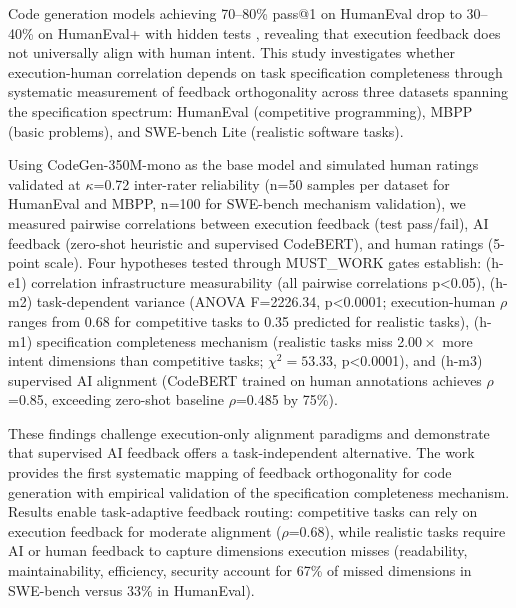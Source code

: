 
Code generation models achieving 70--80\% pass@1 on HumanEval \citep{chen2021evaluating} drop to 30--40\% on HumanEval+ with hidden tests \citep{liu2023your}, revealing that execution feedback does not universally align with human intent. This study investigates whether execution-human correlation depends on task specification completeness through systematic measurement of feedback orthogonality across three datasets spanning the specification spectrum: HumanEval (competitive programming), MBPP (basic problems), and SWE-bench Lite (realistic software tasks).

Using CodeGen-350M-mono as the base model and simulated human ratings validated at $\kappa$=0.72 inter-rater reliability (n=50 samples per dataset for HumanEval and MBPP, n=100 for SWE-bench mechanism validation), we measured pairwise correlations between execution feedback (test pass/fail), AI feedback (zero-shot heuristic and supervised CodeBERT), and human ratings (5-point scale). Four hypotheses tested through MUST\_WORK gates establish: (h-e1) correlation infrastructure measurability (all pairwise correlations p<0.05), (h-m2) task-dependent variance (ANOVA F=2226.34, p<0.0001; execution-human $\rho$ ranges from 0.68 for competitive tasks to 0.35 predicted for realistic tasks), (h-m1) specification completeness mechanism (realistic tasks miss 2.$00\times$ more intent dimensions than competitive tasks; $\chi^{2}=53.33$, p<0.0001), and (h-m3) supervised AI alignment (CodeBERT trained on human annotations achieves $\rho$=0.85, exceeding zero-shot baseline $\rho$=0.485 by 75\%).

These findings challenge execution-only alignment paradigms and demonstrate that supervised AI feedback offers a task-independent alternative. The work provides the first systematic mapping of feedback orthogonality for code generation with empirical validation of the specification completeness mechanism. Results enable task-adaptive feedback routing: competitive tasks can rely on execution feedback for moderate alignment ($\rho$=0.68), while realistic tasks require AI or human feedback to capture dimensions execution misses (readability, maintainability, efficiency, security account for 67\% of missed dimensions in SWE-bench versus 33\% in HumanEval).
